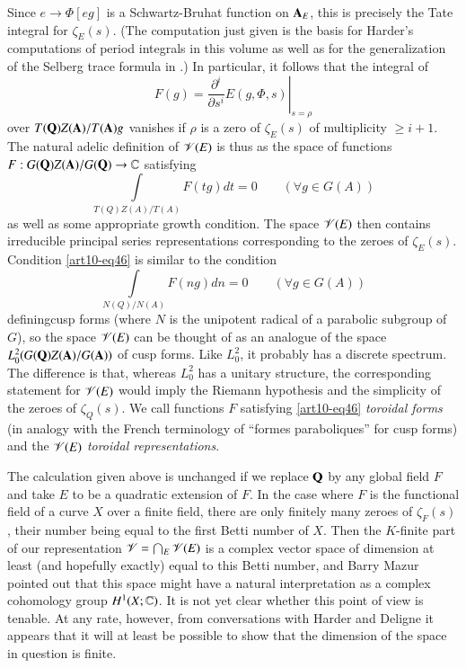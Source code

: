 Since $e \to \Phi [eg]$ is a Schwartz-Bruhat function on $\mathbf{A}_E$, this is precisely the Tate integral for $\zeta_E (s)$. (The computation just given is the basis for Harder's computations of period integrals in this volume as well as for the generalization of the Selberg trace formula in \cite{art10-4}.) In particular, it follows that the integral of 
$$
\left. F(g) = \frac{\partial^i}{\partial s^i} E (g, \Phi, s)  \right|_{s = \rho}
$$
over $T(\mathbf{Q}) Z (\mathbf{A}) / T (\mathbf{A}) g$ vanishes if $\rho$ is a zero of $\zeta_E (s)$ of multiplicity $\geqslant i +1$. The natural adelic definition of $\mathscr{V} (E)$ is thus as the space of functions $F: G (\mathbf{Q}) Z (\mathbf{A}) / G (\mathbf{Q}) \to \mathbb{C}$ satisfying
\begin{equation*}
\int\limits_{T(Q) Z (A) / T (A)} F (tg) dt = 0 \qquad (\forall g \in G (A)) \tag{46} \label{art10-eq46}
\end{equation*}
as well as some appropriate growth condition. The space $\mathscr{V} (E)$ then contains irreducible principal series representations corresponding to the zeroes of $\zeta_E (s)$. Condition \eqref{art10-eq46} is similar to the condition
$$
\int\limits_{N(Q)/ N (A)} F(ng) dn =0 \qquad (\forall g \in G (A))
$$
defining\pageoriginale cusp forms (where $N$ is the unipotent radical of a parabolic subgroup of $G$), so the space $\mathscr{V} (E)$ can be thought of as an analogue of the space $L^2_0(G (\mathbf{Q}) Z (\mathbf{A}) / G (\mathbf{A}))$ of cusp forms. Like $L^2_0$, it probably has a discrete spectrum. The difference is that, whereas $L^2_0$ has a unitary structure, the corresponding statement for $\mathscr{V} (E)$ would imply the Riemann hypothesis and the simplicity of the zeroes of $\zeta_Q (s)$. We call functions $F$ satisfying \eqref{art10-eq46} \textit{toroidal forms} (in analogy with the French terminology of ``formes paraboliques'' for cusp forms) and the $\mathscr{V} (E)$ \textit{toroidal representations}.

The calculation given above is unchanged if we replace $\mathbf{Q}$ by any global field $F$ and take $E$ to be a quadratic extension of $F$. In the case where $F$  is the functional field of a curve $X$ over a finite field, there are only finitely many zeroes of $\zeta_F (s)$, their number being equal to the first Betti number of $X$. Then the $K$-finite part of our representation $\mathscr{V}= \bigcap_E \mathscr{V} (E)$ is a complex vector space of dimension at least (and hopefully exactly) equal to this Betti number, and Barry Mazur pointed out that this space might have a natural interpretation as a complex cohomology group $H^1 (X; \mathbb{C})$. It is not yet clear whether this point of view is tenable. At any rate, however, from conversations with Harder and Deligne it appears that it will at least be possible to show that the dimension of the space in question is finite. 

